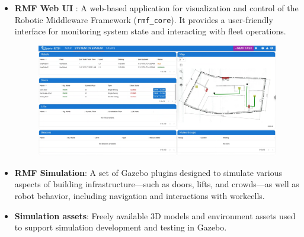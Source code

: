 \begin{itemize}
	\newpage
	\item \textbf{RMF Web UI} : A web-based application for visualization and control of the Robotic Middleware Framework (\texttt{rmf\_core}). It provides a user-friendly interface for monitoring system state and interacting with fleet operations.
	\begin{figure}[h]
		\centering
		\includegraphics[width=0.8\linewidth]{img/RMF_tut_web.png}
		\label{fig:RMF Web}
	\end{figure}
	\item \textbf{RMF Simulation}: A set of Gazebo plugins designed to simulate various aspects of building infrastructure—such as doors, lifts, and crowds—as well as robot behavior, including navigation and interactions with workcells.
	\item \textbf{Simulation assets}: Freely available 3D models and environment assets used to support simulation development and testing in Gazebo.
\end{itemize}

